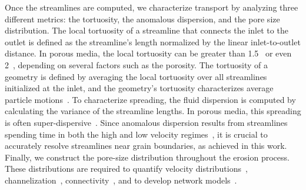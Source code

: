 \documentclass{jfm}
\begin{document}
Once the streamlines are computed, we characterize transport by
analyzing three different metrics: the tortuosity, the anomalous
dispersion, and the pore size distribution.  The local tortuosity of a
streamline that connects the inlet to the outlet is defined as the
streamline's length normalized by the linear inlet-to-outlet distance.
In porous media, the local tortuosity can be greater than
1.5~\citep{kop-kat-tim1996, mat-kha-koz2008} or even
2~\citep{dud-koz-mat2011}, depending on several factors such as the
porosity. The tortuosity of a geometry is defined by averaging the local
tortuosity over all streamlines initialized at the inlet, and the
geometry's tortuosity characterizes average particle
motions~\citep{hak-com-den2019}.  To characterize spreading, the fluid
dispersion is computed by calculating the variance of the streamline
lengths. In porous media, this spreading is often
super-dispersive~\citep{kan-dea-nun-bij-blu-jua2014, cus-hu-den1995,
dea-leb-den-tar-bol-dav2013}. Since anomalous dispersion results from
streamlines spending time in both the high and low velocity
regimes~\citep{ber-sch2001}, it is crucial to accurately resolve
streamlines near grain boundaries, as achieved in this work.  Finally,
we construct the pore-size distribution throughout the erosion process.
These distributions are required to quantify velocity
distributions~\citep{ali-par-wei-bre2017, dea-qua-bir-jua2018},
channelization~\citep{sie-ili-pri-riv-gua2019},
connectivity~\citep{knu-car2005, wes-blo-gra2001}, and to develop
network models~\citep{bry-kin-mel1993, bry-mel-cad1993, bij-blu2006}. 

%
\end{document}
